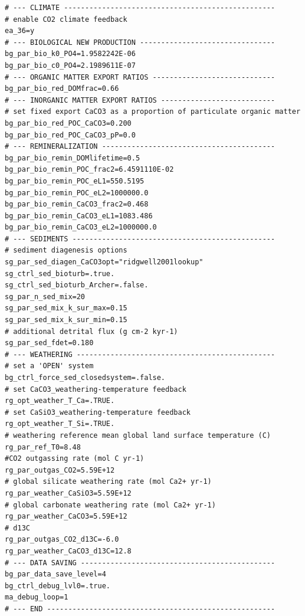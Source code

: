 \scriptsize\begin{verbatim}
# --- CLIMATE --------------------------------------------------
# enable CO2 climate feedback
ea_36=y
# --- BIOLOGICAL NEW PRODUCTION --------------------------------
bg_par_bio_k0_PO4=1.9582242E-06
bg_par_bio_c0_PO4=2.1989611E-07
# --- ORGANIC MATTER EXPORT RATIOS -----------------------------
bg_par_bio_red_DOMfrac=0.66
# --- INORGANIC MATTER EXPORT RATIOS ---------------------------
# set fixed export CaCO3 as a proportion of particulate organic matter
bg_par_bio_red_POC_CaCO3=0.200
bg_par_bio_red_POC_CaCO3_pP=0.0
# --- REMINERALIZATION -----------------------------------------
bg_par_bio_remin_DOMlifetime=0.5
bg_par_bio_remin_POC_frac2=6.4591110E-02
bg_par_bio_remin_POC_eL1=550.5195
bg_par_bio_remin_POC_eL2=1000000.0
bg_par_bio_remin_CaCO3_frac2=0.468
bg_par_bio_remin_CaCO3_eL1=1083.486
bg_par_bio_remin_CaCO3_eL2=1000000.0
# --- SEDIMENTS ------------------------------------------------
# sediment diagenesis options
sg_par_sed_diagen_CaCO3opt="ridgwell2001lookup"
sg_ctrl_sed_bioturb=.true.
sg_ctrl_sed_bioturb_Archer=.false.
sg_par_n_sed_mix=20
sg_par_sed_mix_k_sur_max=0.15
sg_par_sed_mix_k_sur_min=0.15
# additional detrital flux (g cm-2 kyr-1)
sg_par_sed_fdet=0.180
# --- WEATHERING -----------------------------------------------
# set a 'OPEN' system
bg_ctrl_force_sed_closedsystem=.false.
# set CaCO3_weathering-temperature feedback
rg_opt_weather_T_Ca=.TRUE.
# set CaSiO3_weathering-temperature feedback
rg_opt_weather_T_Si=.TRUE.
# weathering reference mean global land surface temperature (C)
rg_par_ref_T0=8.48
#CO2 outgassing rate (mol C yr-1)
rg_par_outgas_CO2=5.59E+12
# global silicate weathering rate (mol Ca2+ yr-1)
rg_par_weather_CaSiO3=5.59E+12
# global carbonate weathering rate (mol Ca2+ yr-1)
rg_par_weather_CaCO3=5.59E+12
# d13C
rg_par_outgas_CO2_d13C=-6.0
rg_par_weather_CaCO3_d13C=12.8
# --- DATA SAVING ----------------------------------------------
bg_par_data_save_level=4
bg_ctrl_debug_lvl0=.true.
ma_debug_loop=1
# --- END ------------------------------------------------------
\end{verbatim}\normalsize

